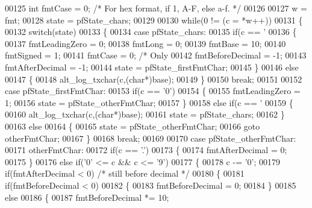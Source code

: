 \begin{DoxyCode}
00125   \textcolor{keywordtype}{int} fmtCase = 0; \textcolor{comment}{/* For hex format, if 1, A-F, else a-f. */}
00126 
00127   w = fmt;
00128   state = pfState\_chars;
00129 
00130   \textcolor{keywordflow}{while}(0 != (c = *w++))
00131     \{
00132     \textcolor{keywordflow}{switch}(state)
00133       \{
00134       \textcolor{keywordflow}{case} pfState\_chars:
00135         \textcolor{keywordflow}{if}(c == \textcolor{charliteral}{'%
00136         \{
00137           fmtLeadingZero = 0;
00138           fmtLong = 0;
00139           fmtBase = 10;
00140           fmtSigned = 1;
00141           fmtCase = 0; \textcolor{comment}{/* Only %
00142           fmtBeforeDecimal = -1;
00143           fmtAfterDecimal = -1;
00144           state = pfState\_firstFmtChar;
00145         \}
00146         \textcolor{keywordflow}{else}
00147         \{
00148           alt\_log\_txchar(c,(\textcolor{keywordtype}{char}*)base);
00149         \}
00150         \textcolor{keywordflow}{break};
00151 
00152       \textcolor{keywordflow}{case} pfState\_firstFmtChar:
00153         \textcolor{keywordflow}{if}(c == \textcolor{charliteral}{'0'})
00154         \{
00155           fmtLeadingZero = 1;
00156           state = pfState\_otherFmtChar;
00157         \}
00158         \textcolor{keywordflow}{else} \textcolor{keywordflow}{if}(c == \textcolor{charliteral}{'%
00159         \{
00160           alt\_log\_txchar(c,(\textcolor{keywordtype}{char}*)base);
00161           state = pfState\_chars;
00162         \}
00163         \textcolor{keywordflow}{else}
00164         \{
00165           state = pfState\_otherFmtChar;
00166           \textcolor{keywordflow}{goto} otherFmtChar;
00167         \}
00168         \textcolor{keywordflow}{break};
00169 
00170       \textcolor{keywordflow}{case} pfState\_otherFmtChar:
00171 otherFmtChar:
00172         \textcolor{keywordflow}{if}(c == \textcolor{charliteral}{'.'})
00173         \{
00174           fmtAfterDecimal = 0;
00175         \}
00176         \textcolor{keywordflow}{else} \textcolor{keywordflow}{if}(\textcolor{charliteral}{'0'} <= c && c <= \textcolor{charliteral}{'9'})
00177         \{
00178           c -= \textcolor{charliteral}{'0'};
00179           \textcolor{keywordflow}{if}(fmtAfterDecimal < 0)     \textcolor{comment}{/* still before decimal */}
00180           \{
00181             \textcolor{keywordflow}{if}(fmtBeforeDecimal < 0)
00182             \{
00183               fmtBeforeDecimal = 0;
00184             \}
00185             \textcolor{keywordflow}{else}
00186             \{
00187               fmtBeforeDecimal *= 10;
}}}
\end{DoxyCode}
